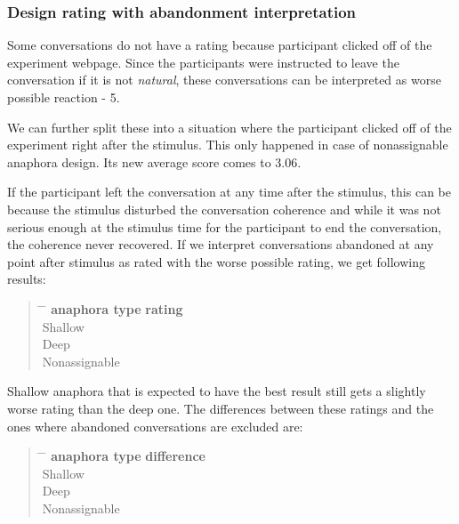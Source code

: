 \subsubsection{Design rating with abandonment interpretation}

Some conversations do not have a rating because participant clicked off of the experiment webpage.
Since the participants were instructed to leave the conversation if it is not \textit{natural},
these conversations can be interpreted as worse possible reaction - 5.

We can further split these into a situation where
the participant clicked off of the experiment
right after the stimulus.
This only happened in case of nonassignable anaphora design.
Its new average score comes to 3.06.

If the participant left the conversation at any time after the stimulus,
this can be because the stimulus disturbed the conversation coherence
and while it was not serious enough at the stimulus time for the participant
to end the conversation,
the coherence never recovered.
If we interpret conversations abandoned at any point after stimulus as rated with the worse possible rating,
we get following results:

\begin{quote}
\begin{tabbing}
\hspace{4cm} \= \hspace{4cm} \= \kill %
\textbf{anaphora type} \> \textbf{rating} \\
Shallow  \\
Deep  \\
Nonassignable  \\
\end{tabbing}
\end{quote}

Shallow anaphora that is expected to have the best result still gets a slightly worse rating than the deep one.
The differences between these ratings and the ones where abandoned conversations are excluded are:

\begin{quote}
\begin{tabbing}
\hspace{4cm} \= \hspace{4cm} \= \kill %
\textbf{anaphora type} \> \textbf{difference} \\
Shallow  \\
Deep  \\
Nonassignable  \\
\end{tabbing}
\end{quote}

